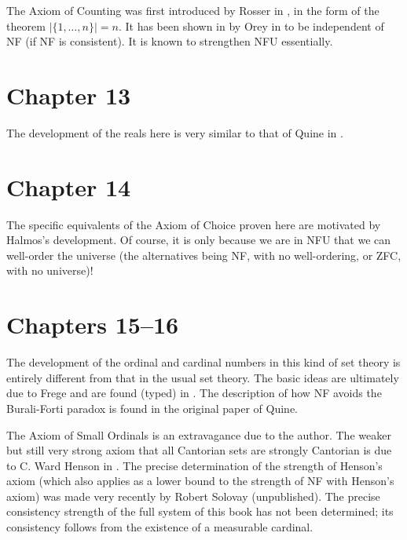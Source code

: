 The Axiom of Counting was first introduced by Rosser
in \cite{rosser}, in the form of the theorem $|\{1,\ldots,n\}| = n$.  It has
been shown in by Orey in \cite{orey} to be independent of NF (if
NF is consistent).  It is known to strengthen NFU
essentially.





\section*{Chapter 13}

The development of the reals here is very similar to that
of Quine in \cite{ml}.




\section*{Chapter 14}

The specific equivalents of the Axiom of Choice
proven here are motivated by Halmos's development.  Of course, it is
only because we are in NFU that we can
well-order the universe (the alternatives being NF, with no
well-ordering, or ZFC, with
no universe)!




\section*{Chapters 15--16}

The development of the ordinal and cardinal numbers in
this kind of 
set theory is entirely different from that in the usual set theory. 
The basic ideas are ultimately due to Frege and are found (typed) in 
\cite{russell}.  The description of how NF avoids the
Burali-Forti paradox is found in the original
paper \cite{quine} of Quine.

The Axiom of Small Ordinals is an extravagance
due to the author.  The 
weaker but still very strong axiom that all Cantorian sets are 
strongly Cantorian is due to C. Ward Henson in \cite{henson}.  The
precise determination of the strength of Henson's axiom (which also
applies as a lower bound to the strength of NF with Henson's
axiom) was made very recently by Robert Solovay (unpublished).  The
precise consistency strength of the full system of this book has not
been determined; its consistency follows from the existence of a
measurable cardinal.

